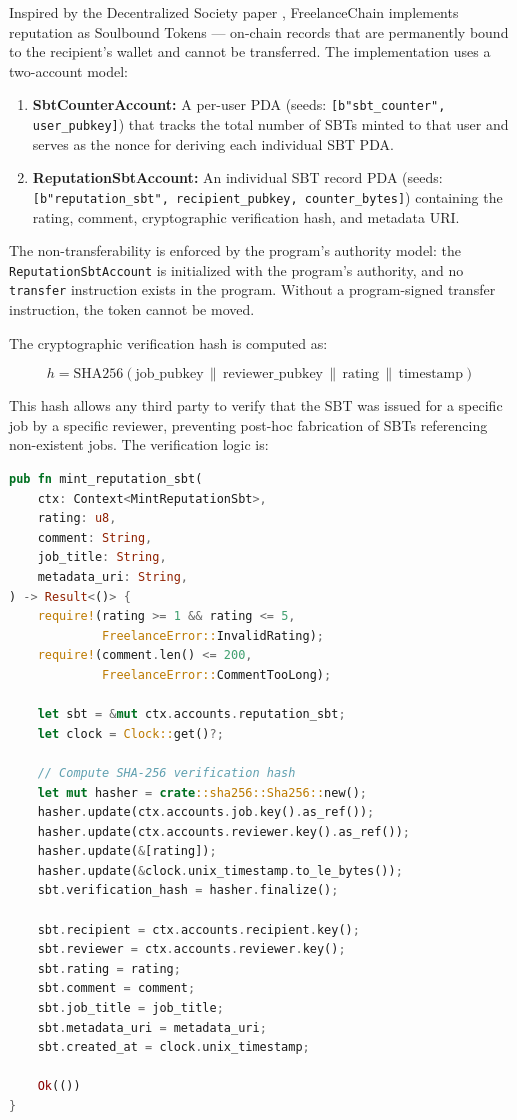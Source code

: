 Inspired by the Decentralized Society paper \cite{weyl2022decentralized}, FreelanceChain implements reputation as Soulbound Tokens --- on-chain records that are permanently bound to the recipient's wallet and cannot be transferred. The implementation uses a two-account model:

\begin{enumerate}
    \item \textbf{SbtCounterAccount:} A per-user PDA (seeds: \texttt{[b"sbt\_counter", user\_pubkey]}) that tracks the total number of SBTs minted to that user and serves as the nonce for deriving each individual SBT PDA.
    \item \textbf{ReputationSbtAccount:} An individual SBT record PDA (seeds: \texttt{[b"reputation\_sbt", recipient\_pubkey, counter\_bytes]}) containing the rating, comment, cryptographic verification hash, and metadata URI.
\end{enumerate}

The non-transferability is enforced by the program's authority model: the \texttt{ReputationSbtAccount} is initialized with the program's authority, and no \texttt{transfer} instruction exists in the program. Without a program-signed transfer instruction, the token cannot be moved.

The cryptographic verification hash is computed as:

\begin{equation}
    h = \text{SHA256}(\text{job\_pubkey} \,\|\, \text{reviewer\_pubkey} \,\|\, \text{rating} \,\|\, \text{timestamp})
\end{equation}

This hash allows any third party to verify that the SBT was issued for a specific job by a specific reviewer, preventing post-hoc fabrication of SBTs referencing non-existent jobs. The verification logic is:

\begin{lstlisting}[language=Rust, caption={SBT minting with verification hash in Anchor}, label={lst:sbt_mint}]
pub fn mint_reputation_sbt(
    ctx: Context<MintReputationSbt>,
    rating: u8,
    comment: String,
    job_title: String,
    metadata_uri: String,
) -> Result<()> {
    require!(rating >= 1 && rating <= 5,
             FreelanceError::InvalidRating);
    require!(comment.len() <= 200,
             FreelanceError::CommentTooLong);

    let sbt = &mut ctx.accounts.reputation_sbt;
    let clock = Clock::get()?;

    // Compute SHA-256 verification hash
    let mut hasher = crate::sha256::Sha256::new();
    hasher.update(ctx.accounts.job.key().as_ref());
    hasher.update(ctx.accounts.reviewer.key().as_ref());
    hasher.update(&[rating]);
    hasher.update(&clock.unix_timestamp.to_le_bytes());
    sbt.verification_hash = hasher.finalize();

    sbt.recipient = ctx.accounts.recipient.key();
    sbt.reviewer = ctx.accounts.reviewer.key();
    sbt.rating = rating;
    sbt.comment = comment;
    sbt.job_title = job_title;
    sbt.metadata_uri = metadata_uri;
    sbt.created_at = clock.unix_timestamp;

    Ok(())
}
\end{lstlisting}

